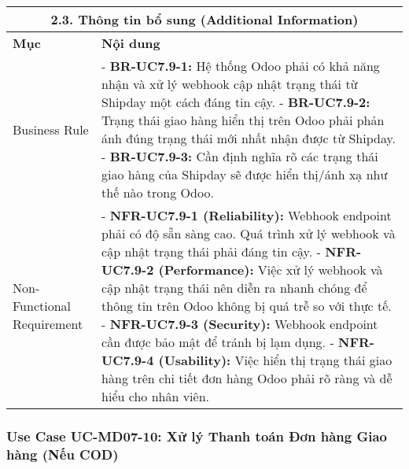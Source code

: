 \begin{longtable}{|m{4cm}|p{11cm}|}
\hline
\multicolumn{2}{|c|}{\textbf{2.3. Thông tin bổ sung (Additional Information)}} \\
\hline
\textbf{Mục} & \textbf{Nội dung} \\
\hline
Business Rule & - \textbf{BR-UC7.9-1:} Hệ thống Odoo phải có khả năng nhận và xử lý webhook cập nhật trạng thái từ Shipday một cách đáng tin cậy. \newline - \textbf{BR-UC7.9-2:} Trạng thái giao hàng hiển thị trên Odoo phải phản ánh đúng trạng thái mới nhất nhận được từ Shipday. \newline - \textbf{BR-UC7.9-3:} Cần định nghĩa rõ các trạng thái giao hàng của Shipday sẽ được hiển thị/ánh xạ như thế nào trong Odoo. \\
\hline
Non-Functional Requirement & - \textbf{NFR-UC7.9-1 (Reliability):} Webhook endpoint phải có độ sẵn sàng cao. Quá trình xử lý webhook và cập nhật trạng thái phải đáng tin cậy. \newline - \textbf{NFR-UC7.9-2 (Performance):} Việc xử lý webhook và cập nhật trạng thái nên diễn ra nhanh chóng để thông tin trên Odoo không bị quá trễ so với thực tế. \newline - \textbf{NFR-UC7.9-3 (Security):} Webhook endpoint cần được bảo mật để tránh bị lạm dụng. \newline - \textbf{NFR-UC7.9-4 (Usability):} Việc hiển thị trạng thái giao hàng trên chi tiết đơn hàng Odoo phải rõ ràng và dễ hiểu cho nhân viên. \\
\hline
\end{longtable}

\subsubsection{Use Case UC-MD07-10: Xử lý Thanh toán Đơn hàng Giao hàng (Nếu COD)}


